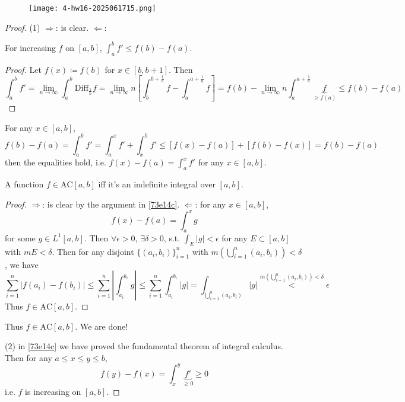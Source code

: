 \begin{exercise}
\begin{figure}[H]
\centering
\texttt{[image: 4-hw16-2025061715.png]}
\label{}
\end{figure}
\end{exercise}
\begin{proof}
(1)
$\Rightarrow$: is clear. $\Leftarrow$:

\begin{lemma}
For increasing $f$ on $[a,b]$, $\int_{a}^{b}f'\leq f(b)-f(a)$.
\end{lemma}
\begin{proof}
Let $f(x)\coloneqq f(b)$ for $x\in[b,b+1]$. Then
\[
\int_{a}^{b} f'=\lim_{ n \to \infty } \int_{a}^{b} \text{Diff}_{\frac{1}{n}}f=\lim_{ n \to \infty }n \left[ \int_{b}^{b+\frac{1}{n}}f-\int_{a}^{a+\frac{1}{n}} f  \right]=f(b)-\lim_{ n \to \infty } n\int_{a}^{a+\frac{1}{n}} \underbrace{ f }_{ \geq f(a) }\leq f(b)-f(a)
\]
\end{proof}
For any $x\in[a,b]$,
\[
f(b)-f(a)=\int_{a}^{b} f'=\int_{a}^{x} f'+\int_{x}^{b} f'\leq [f(x)-f(a)]+[f(b)-f(x)] =f(b)-f(a)
\]
then the equalities hold, i.e. $f(x)-f(a)=\int_{a}^{x}f'$ for any $x\in[a,b]$.

\begin{lemma}
A function $f\in\text{AC}[a,b]$ iff it's an indefinite integral over $[a,b]$.
\end{lemma}
\begin{proof}
$\Rightarrow$: is clear by the argument in \cref{73e14c}. $\Leftarrow$: for any $x\in[a,b]$,
\[
f(x)-f(a)=\int_{a}^{x} g
\]
for some $g\in L^{1}[a,b]$. Then $\forall\epsilon>0$, $\exists\delta>0$, s.t. $\int_{E}^{}\lvert g \rvert<\epsilon$ for any $E\subset[a,b]$ with $mE<\delta$. Then for any disjoint $\{ (a_i,b_i) \}_{i=1}^{n}$ with $m\left( \bigcup_{i=1}^{n}(a_i,b_i) \right)<\delta$, we have
\[
\sum_{i=1}^{n} \lvert f(a_i)-f(b_i) \rvert \leq \sum_{i=1}^{n} \left\lvert  \int_{a_i}^{b_i} g   \right\rvert \leq \sum_{i=1}^{n} \int_{a_i}^{b_i} \lvert g \rvert =\int_{\bigcup_{i=1}^{n} (a_i,b_i)}\lvert g \rvert \overset{ m\left( \bigcup_{i=1}^{n} (a_i,b_i) \right)<\delta }{ < }\epsilon
\]
Thus $f\in\text{AC}[a,b]$.
\end{proof}

Thus $f\in\text{AC}[a,b]$. We are done!

(2) in \cref{73e14c} we have proved the fundamental theorem of integral calculus. Then for any $a\leq x\leq y\leq b$,
\[
f(y)-f(x)=\int_{x}^{y} \underbrace{ f' }_{ \geq 0 }\geq 0
\]
i.e. $f$ is increasing on $[a,b]$.
\end{proof}

